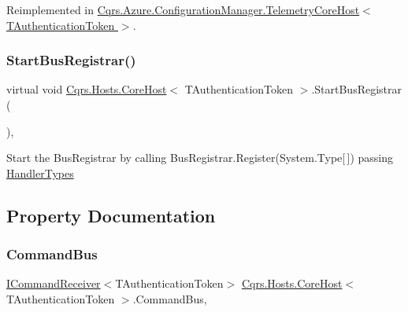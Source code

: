 Reimplemented in \hyperlink{classCqrs_1_1Azure_1_1ConfigurationManager_1_1TelemetryCoreHost_a37c8e3f829743d6be1108b3fd8a5a3e7_a37c8e3f829743d6be1108b3fd8a5a3e7}{Cqrs.\+Azure.\+Configuration\+Manager.\+Telemetry\+Core\+Host$<$ T\+Authentication\+Token $>$}.

\mbox{\label{classCqrs_1_1Hosts_1_1CoreHost_af743bda749d5b95aecb4ee4a4e2a263f_af743bda749d5b95aecb4ee4a4e2a263f}} 
\subsubsection{\texorpdfstring{Start\+Bus\+Registrar()}{StartBusRegistrar()}}
{\footnotesize\ttfamily virtual void \hyperlink{classCqrs_1_1Hosts_1_1CoreHost}{Cqrs.\+Hosts.\+Core\+Host}$<$ T\+Authentication\+Token $>$.Start\+Bus\+Registrar (\begin{DoxyParamCaption}{ }\end{DoxyParamCaption})\hspace{0.3cm}{\ttfamily [protected]}, {\ttfamily [virtual]}}



Start the Bus\+Registrar by calling Bus\+Registrar.\+Register(\+System.\+Type\mbox{[}$\,$\mbox{]}) passing \hyperlink{classCqrs_1_1Hosts_1_1CoreHost_a7bfb4acd3b84a95d341b57cc28388023_a7bfb4acd3b84a95d341b57cc28388023}{Handler\+Types} 



\subsection{Property Documentation}
\mbox{\label{classCqrs_1_1Hosts_1_1CoreHost_a3d9121f200c8bb6b1cfe1d93ae96461e_a3d9121f200c8bb6b1cfe1d93ae96461e}} 
\subsubsection{\texorpdfstring{Command\+Bus}{CommandBus}}
{\footnotesize\ttfamily \hyperlink{interfaceCqrs_1_1Commands_1_1ICommandReceiver}{I\+Command\+Receiver}$<$T\+Authentication\+Token$>$ \hyperlink{classCqrs_1_1Hosts_1_1CoreHost}{Cqrs.\+Hosts.\+Core\+Host}$<$ T\+Authentication\+Token $>$.Command\+Bus\hspace{0.3cm}{\ttfamily [get]}, {\ttfamily [protected]}}



